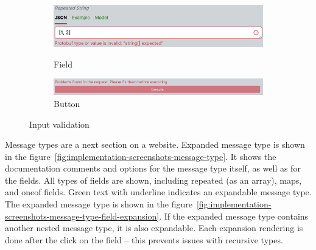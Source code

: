 \begin{figure}[!htb]
    \centering
    \captionsetup{justification=centering}

    \begin{subfigure}{1\textwidth}
        \centering
        \includegraphics[width=.8\linewidth]{images/implementation/screenshots/input-validation-error}
        \caption{Field}

        \centering
        \includegraphics[width=.8\linewidth]{images/implementation/screenshots/input-validation-error-button}
        \caption{Button}
    \end{subfigure}%

    \caption{Input validation}
    \label{fig:implementation-screenshots-inputs-validation}
\end{figure}


Message types are a next section on a website.
Expanded message type is shown in the figure~\ref{fig:implementation-screenshots-message-type}.
It shows the documentation comments and options for the message type itself, as well as for the fields.
All types of fields are shown, including repeated (as an array), maps, and oneof fields.
Green text with underline indicates an expandable message type.
The expanded message type is shown in the figure~\ref{fig:implementation-screenshots-message-type-field-expansion}.
If the expanded message type contains another nested message type, it is also expandable.
Each expansion rendering is done after the click on the field -- this prevents issues with recursive types.

